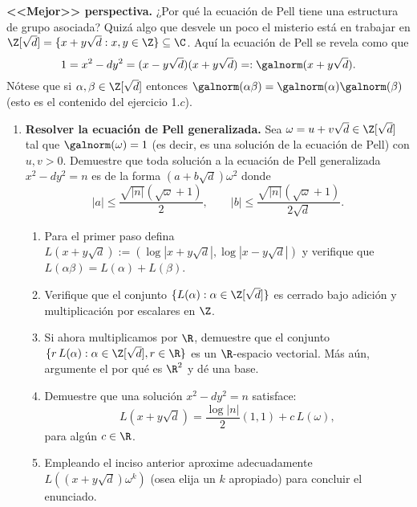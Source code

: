 \documentclass[11pt, reqno]{amsart}
\begin{document}
\textbf{<<Mejor>> perspectiva.}
¿Por qué la ecuación de Pell tiene una estructura de grupo asociada?
Quizá algo que desvele un poco el misterio está en trabajar en $\Z[ \sqrt{d} ] = \{ x + y\sqrt{d} : x, y\in\Z \} \subseteq \C$.
Aquí la ecuación de Pell se revela como que
$$ 1 = x^2 - dy^2 = (x - y\sqrt{d})(x + y\sqrt{d}) =: \galnorm(x + y\sqrt{d}). $$
Nótese que si $\alpha, \beta \in \Z[ \sqrt{d} ]$ entonces $\galnorm(\alpha \beta) = \galnorm(\alpha) \galnorm(\beta)$ (esto es el contenido del ejercicio 1.$c$).

\begin{enumerate}[resume]
	\item \hard
		\textbf{Resolver la ecuación de Pell generalizada.} Sea $\omega = u + v\sqrt{d} \in \Z[ \sqrt{d} ]$ tal que $\galnorm(\omega) = 1$
		(es decir, es una solución de la ecuación de Pell) con $u, v > 0$.
		Demuestre que toda solución a la ecuación de Pell generalizada $x^2 - dy^2 = n$ es de la forma $(a + b\sqrt{d}) \omega^2$ donde
		$$ |a| \le \frac{ \sqrt{|n|}(\sqrt{\omega} + 1) }{2},
		\qquad |b| \le \frac{ \sqrt{|n|}(\sqrt{\omega} + 1) }{2\sqrt{d}}. $$
		\begin{enumerate}
			\item Para el primer paso defina $L(x + y\sqrt{d}) := ( \log|x + y\sqrt{d}|, \log|x - y\sqrt{d}| )$
				y verifique que $L(\alpha \beta) = L(\alpha) + L(\beta)$.
			\item Verifique que el conjunto $\{ L(\alpha) : \alpha \in \Z[ \sqrt{d} ] \}$ es cerrado bajo adición y multiplicación
				por escalares en $\Z$.
			\item Si ahora multiplicamos por $\R$, demuestre que el conjunto $\{ r \, L(\alpha) : \alpha \in \Z[\sqrt{d}], r \in \R \}$
				es un $\R$-espacio vectorial.
				Más aún, argumente el por qué es $\R^2$ y dé una base.
			\item Demuestre que una solución $x^2 - dy^2 = n$ satisface:
				$$ L(x + y \sqrt{d}) = \frac{\log|n|}{2}(1, 1) + c \, L(\omega), $$
				para algún $c \in \R$.
			\item Empleando el inciso anterior aproxime adecuadamente $L((x + y\sqrt{d}) \omega^k)$ (osea elija un $k$ apropiado)
				para concluir el enunciado.
		\end{enumerate}
\end{enumerate}
\end{document}
